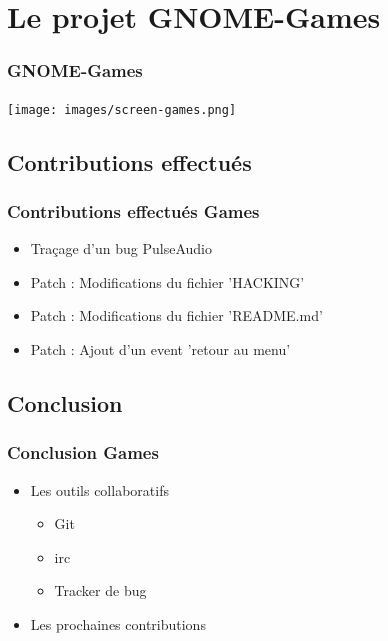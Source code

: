 \documentclass{beamer}
\begin{document}
\section{Le projet GNOME-Games}
\begin{frame}
  \frametitle{GNOME-Games}
  \texttt{[image: images/screen-games.png]}
\end{frame}

\subsection{Contributions effectués}
\begin{frame}
  \frametitle{Contributions effectués Games}
  \begin{itemize}
    \item Traçage d'un bug PulseAudio
    \item Patch : Modifications du fichier 'HACKING'
    \item Patch : Modifications du fichier 'README.md'
    \item Patch : Ajout d'un event 'retour au menu'
  \end{itemize}
\end{frame}

\subsection{Conclusion}
\begin{frame}
  \frametitle{Conclusion Games}
  \begin{itemize}
  \item Les outils collaboratifs
    \begin{itemize}
    \item Git
    \item irc
    \item Tracker de bug
    \end{itemize}
  \item Les prochaines contributions
  \end{itemize}
\end{frame}
\end{document}
